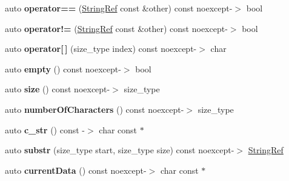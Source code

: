 \begin{DoxyCompactItemize}
\item 
auto {\bfseries operator==} (\hyperlink{classCatch_1_1StringRef}{String\+Ref} const \&other) const noexcept-\/$>$ bool\hypertarget{classCatch_1_1StringRef_a04c84d944fb51b02552e7ce8de7dbbf0}{}\label{classCatch_1_1StringRef_a04c84d944fb51b02552e7ce8de7dbbf0}

\item 
auto {\bfseries operator!=} (\hyperlink{classCatch_1_1StringRef}{String\+Ref} const \&other) const noexcept-\/$>$ bool\hypertarget{classCatch_1_1StringRef_a015f7b3adee8fe49ebb8172ae2975d21}{}\label{classCatch_1_1StringRef_a015f7b3adee8fe49ebb8172ae2975d21}

\item 
auto {\bfseries operator\mbox{[}$\,$\mbox{]}} (size\+\_\+type index) const noexcept-\/$>$ char\hypertarget{classCatch_1_1StringRef_a803e3617331820a7ad8fea3051d6b094}{}\label{classCatch_1_1StringRef_a803e3617331820a7ad8fea3051d6b094}

\item 
auto {\bfseries empty} () const noexcept-\/$>$ bool\hypertarget{classCatch_1_1StringRef_a326d5d5c97e0e792d66a9056143a922b}{}\label{classCatch_1_1StringRef_a326d5d5c97e0e792d66a9056143a922b}

\item 
auto {\bfseries size} () const noexcept-\/$>$ size\+\_\+type\hypertarget{classCatch_1_1StringRef_aa370158c82397f443a16f96ab3133950}{}\label{classCatch_1_1StringRef_aa370158c82397f443a16f96ab3133950}

\item 
auto {\bfseries number\+Of\+Characters} () const noexcept-\/$>$ size\+\_\+type\hypertarget{classCatch_1_1StringRef_ac1f444eb9a9c7ba18b3f71fc85f3222f}{}\label{classCatch_1_1StringRef_ac1f444eb9a9c7ba18b3f71fc85f3222f}

\item 
auto {\bfseries c\+\_\+str} () const -\/$>$ char const $\ast$\hypertarget{classCatch_1_1StringRef_a1669cb2765e820ca258159676cbd82a5}{}\label{classCatch_1_1StringRef_a1669cb2765e820ca258159676cbd82a5}

\item 
auto {\bfseries substr} (size\+\_\+type start, size\+\_\+type size) const noexcept-\/$>$ \hyperlink{classCatch_1_1StringRef}{String\+Ref}\hypertarget{classCatch_1_1StringRef_a7ce373cbe7068bdc118b8f0fc9a2d44d}{}\label{classCatch_1_1StringRef_a7ce373cbe7068bdc118b8f0fc9a2d44d}

\item 
auto {\bfseries current\+Data} () const noexcept-\/$>$ char const $\ast$\hypertarget{classCatch_1_1StringRef_aa8dd423c873140a92282bc7099ec67fc}{}\label{classCatch_1_1StringRef_aa8dd423c873140a92282bc7099ec67fc}

\end{DoxyCompactItemize}
